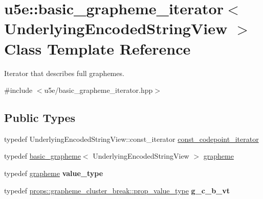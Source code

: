 \hypertarget{classu5e_1_1basic__grapheme__iterator}{}\section{u5e\+:\+:basic\+\_\+grapheme\+\_\+iterator$<$ Underlying\+Encoded\+String\+View $>$ Class Template Reference}
\label{classu5e_1_1basic__grapheme__iterator}


Iterator that describes full graphemes.  




{\ttfamily \#include $<$u5e/basic\+\_\+grapheme\+\_\+iterator.\+hpp$>$}

\subsection*{Public Types}
\begin{DoxyCompactItemize}
\item 
typedef Underlying\+Encoded\+String\+View\+::const\+\_\+iterator \hyperlink{classu5e_1_1basic__grapheme__iterator_a3fd90c1a24fccf790b94199950339846}{const\+\_\+codepoint\+\_\+iterator}
\item 
typedef \hyperlink{classu5e_1_1basic__grapheme}{basic\+\_\+grapheme}$<$ Underlying\+Encoded\+String\+View $>$ \hyperlink{classu5e_1_1basic__grapheme__iterator_a7417c5ebb0987c2c74bcfe2cf1be0173}{grapheme}
\item 
typedef \hyperlink{classu5e_1_1basic__grapheme__iterator_a7417c5ebb0987c2c74bcfe2cf1be0173}{grapheme} {\bfseries value\+\_\+type}\hypertarget{classu5e_1_1basic__grapheme__iterator_a8f6f40f4385df933196b992f3347a5c0}{}\label{classu5e_1_1basic__grapheme__iterator_a8f6f40f4385df933196b992f3347a5c0}

\item 
typedef \hyperlink{classu5e_1_1props_1_1grapheme__cluster__break_a49537cfb39f9510acd4096379687cf93}{props\+::grapheme\+\_\+cluster\+\_\+break\+::prop\+\_\+value\+\_\+type} {\bfseries g\+\_\+c\+\_\+b\+\_\+vt}\hypertarget{classu5e_1_1basic__grapheme__iterator_a6615eda0004e78fe9f7032754e2acfff}{}\label{classu5e_1_1basic__grapheme__iterator_a6615eda0004e78fe9f7032754e2acfff}

\end{DoxyCompactItemize}
